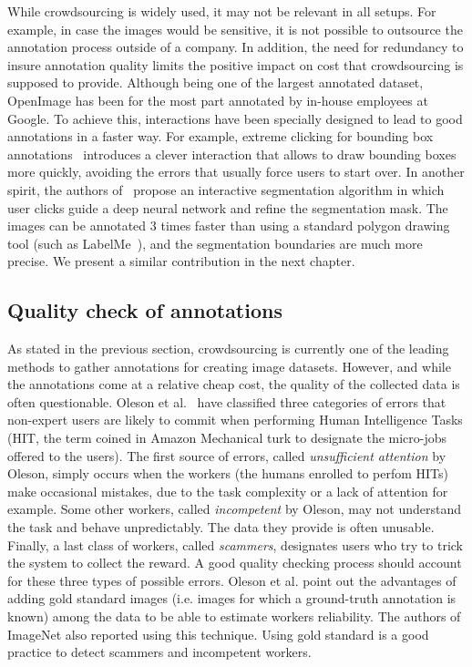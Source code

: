 While crowdsourcing is widely used, it may not be relevant in all setups.
For example, in case the images would be sensitive,
it is not possible to outsource the annotation process outside of a company.
In addition, the need for redundancy to insure annotation quality
limits the positive impact on cost that crowdsourcing is supposed to provide.
Although being one of the largest annotated dataset,
OpenImage has been for the most part annotated by in-house employees at Google.
To achieve this, interactions have been specially designed to lead
to good annotations in a faster way.
For example, extreme clicking for bounding box annotations~\cite{papadopoulos2017extreme}
introduces a clever interaction that allows to draw bounding boxes more quickly,
avoiding the errors that usually force users to start over.
In another spirit, the authors of~\cite{OpenImagesSegmentation}
propose an interactive segmentation algorithm in which user clicks
guide a deep neural network and refine the segmentation mask.
The images can be annotated 3 times faster than
using a standard polygon drawing tool (such as LabelMe~\cite{russell2008labelme}),
and the segmentation boundaries are much more precise.
We present a similar contribution in the next chapter.


\subsection{Quality check of annotations}%
\label{sec:annotation_quality}

As stated in the previous section, crowdsourcing is currently one of
the leading methods to gather annotations for creating image datasets.
However, and while the annotations come at a relative cheap cost,
the quality of the collected data is often questionable.
Oleson et al.~\cite{oleson2011programmatic} have classified
three categories of errors that non-expert users are likely to commit
when performing Human Intelligence Tasks
(HIT, the term coined in Amazon Mechanical turk to designate the micro-jobs offered to the users).
The first source of errors, called \textit{unsufficient attention} by Oleson,
simply occurs when the workers (the humans enrolled to perfom HITs)
make occasional mistakes, due to the task complexity or a lack of attention for example.
Some other workers, called \textit{incompetent} by Oleson,
may not understand the task and behave unpredictably.
The data they provide is often unusable.
Finally, a last class of workers, called \textit{scammers},
designates users who try to trick the system to collect the reward.
A good quality checking process should account for these three types of possible errors.
Oleson et al. point out the advantages of adding gold standard images
(i.e. images for which a ground-truth annotation is known)
among the data to be able to estimate workers reliability.
The authors of ImageNet \cite{ILSVRC15} also reported using this technique.
Using gold standard is a good practice to detect scammers and incompetent workers.

